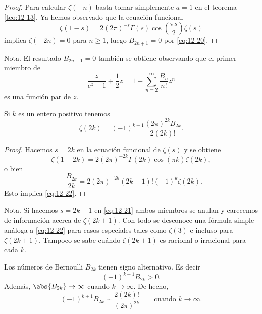 \documentclass[12pt,a4paper]{book}
\begin{document}
    \begin{proof}
        Para calcular $\zeta(-n)$ basta tomar simplemente $a=1$ en el teorema
        \ref{teo:12-13}. Ya hemos observado que la ecuación funcional
        \begin{equation}\label{eq:12-21}
            \zeta(1-s)=2(2\pi)^{-s}\Gamma(s)\cos\left(\frac{\pi s}{2}\right)\zeta(s)
        \end{equation}
        implica $\zeta(-2n)=0$ para $n\geq1$, luego $B_{2n+1}=0$ por \eqref{eq:12-20}.
    \end{proof}

    Nota. El resultado $B_{2n-1}=0$ también se obtiene observando que el primer miembro de
    \begin{equation*}
        \frac{z}{e^{z}-1}+\frac{1}{2}z=1+\sum_{n=2}^{\infty}\frac{B_{n}}{n!}z^{n}
    \end{equation*}
    es una función par de $z$.

    \begin{teorema}\label{teo:12-17}
        Si $k$ es un entero positivo tenemos
        \begin{equation}\label{eq:12-22}
            \zeta(2k)=(-1)^{k+1}\frac{(2\pi)^{2k}B_{2k}}{2(2k)!}.
        \end{equation}
    \end{teorema}

    \begin{proof}
        Hacemos $s=2k$ en la ecuación funcional de $\zeta(s)$ y se obtiene
        \begin{equation*}
            \zeta(1-2k)=2(2\pi)^{-2k}\Gamma(2k)\cos(\pi k)\zeta(2k),
        \end{equation*}
        o bien
        \begin{equation*}
            -\frac{B_{2k}}{2k}=2(2\pi)^{-2k}(2k-1)!(-1)^{k}\zeta(2k).
        \end{equation*}
        Esto implica \eqref{eq:12-22}.
    \end{proof}

    Nota. Si hacemos $s=2k-1$ en \eqref{eq:12-21} ambos miembros se anulan y carecemos de
    información acerca de $\zeta(2k+1)$. Con todo se desconoce una fórmula simple análoga a
    \eqref{eq:12-22} para casos especiales tales como $\zeta(3)$ e incluso para $\zeta(2k+1)$.
    Tampoco se sabe cuándo $\zeta(2k+1)$ es racional o irracional para cada $k$.

    \begin{teorema}\label{teo:12-18}
        Los números de Bernoulli $B_{2k}$ tienen signo alternativo. Es decir
        \begin{equation*}
            (-1)^{k+1}B_{2k}>0.
        \end{equation*}
        Además, $\abs{B_{2k}}\to\infty$ cuando $k\to\infty$. De hecho,
        \begin{equation}\label{eq:12-23}
            (-1)^{k+1}B_{2k}\sim\frac{2(2k)!}{(2\pi)^{2k}}\qquad\text{cuando }k\to\infty.
        \end{equation}
    \end{teorema}
\end{document}
